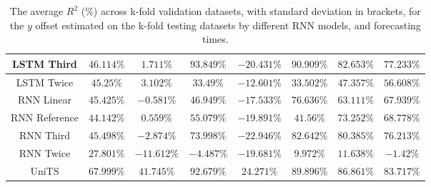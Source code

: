 \begin{table}[!ht]
{\begin{tabular}{|c|c|c|c|c|c|c|c|}
			LSTM Third & $46.114\%$ & $1.711\%$ & $93.849\%$ & $-20.431\%$ & $\mathbf{90.909\%}$ & $82.653\%$ & $77.233\%$ \\ \hline
			LSTM Twice & $45.25\%$ & $3.102\%$ & $33.49\%$ & $-12.601\%$ & $33.502\%$ & $47.357\%$ & $56.608\%$ \\ \hline
			RNN Linear & $45.425\%$ & $-0.581\%$ & $46.949\%$ & $-17.533\%$ & $76.636\%$ & $63.111\%$ & $67.939\%$ \\ \hline
			RNN Reference & $44.142\%$ & $0.559\%$ & $55.079\%$ & $-19.891\%$ & $41.56\%$ & $73.252\%$ & $68.778\%$ \\ \hline
			RNN Third & $45.498\%$ & $-2.874\%$ & $73.998\%$ & $-22.946\%$ & $82.642\%$ & $80.385\%$ & $76.213\%$ \\ \hline
			RNN Twice & $27.801\%$ & $-11.612\%$ & $-4.487\%$ & $-19.681\%$ & $9.972\%$ & $11.638\%$ & $-1.42\%$ \\ \hline
			UniTS & $\mathbf{67.999\%}$ & $\mathbf{41.745\%}$ & $92.679\%$ & $\mathbf{24.271\%}$ & $89.896\%$ & $86.861\%$ & $83.717\%$ \\ \hline
		\end{tabular}
	}
	\caption{The average $R^{2}$ (\%) across k-fold validation datasets, with standard deviation in brackets, for the $y$ offset estimated on the k-fold testing datasets by different RNN models, and forecasting times.}
	\label{tab:all_latitude_no_abs_R2}
\end{table}

